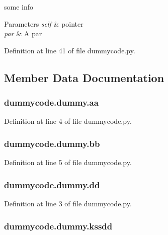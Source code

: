 some info 


\begin{DoxyParams}{Parameters}
{\em self} & pointer \\
\hline
{\em par} & A par \\
\hline
\end{DoxyParams}


Definition at line 41 of file dummycode.\-py.



\subsection{Member Data Documentation}
\subsubsection[{aa}]{\setlength{\rightskip}{0pt plus 5cm}dummycode.\-dummy.\-aa}\label{classdummycode_1_1dummy_ade8c2a23728fea407400de565af9d924}


Definition at line 4 of file dummycode.\-py.

\subsubsection[{bb}]{\setlength{\rightskip}{0pt plus 5cm}dummycode.\-dummy.\-bb}\label{classdummycode_1_1dummy_a8fc4a473d7dc65b38abc8ca2bbf56d0c}


Definition at line 5 of file dummycode.\-py.

\subsubsection[{dd}]{\setlength{\rightskip}{0pt plus 5cm}dummycode.\-dummy.\-dd}\label{classdummycode_1_1dummy_af2feb69e325549343d505d0f5afaacd0}


Definition at line 3 of file dummycode.\-py.

\subsubsection[{kssdd}]{\setlength{\rightskip}{0pt plus 5cm}dummycode.\-dummy.\-kssdd}\label{classdummycode_1_1dummy_ada8cd7476ddcf39248ec97cb1c7367e9}


